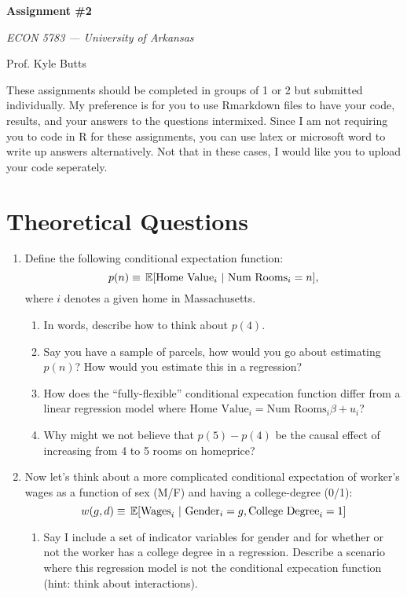 \documentclass[12pt]{article}
\begin{document}
\begin{center}
  {\Huge\bf Assignment \#2}
  
  \smallskip
  {\large\it  ECON 5783 — University of Arkansas}

  \medskip
  {\large Prof. Kyle Butts}
\end{center}

These assignments should be completed in groups of 1 or 2 but submitted individually. My preference is for you to use Rmarkdown files to have your code, results, and your answers to the questions intermixed. Since I am not requiring you to code in R for these assignments, you can use latex or microsoft word to write up answers alternatively. Not that in these cases, I would like you to upload your code seperately. 

\section*{Theoretical Questions}

\begin{enumerate}
  \item Define the following conditional expectation function: $$
    p(n) \equiv \expec{\text{Home Value}_i}{\text{Num Rooms}_i = n},
  $$
  where $i$ denotes a given home in Massachusetts. 
  \begin{enumerate}
    \item In words, describe how to think about $p(4)$.
    
    \item Say you have a sample of parcels, how would you go about estimating $p(n)$? How would you estimate this in a regression?
    
    \item How does the ``fully-flexible'' conditional expecation function differ from a linear regression model where $\text{Home Value}_i = \text{Num Rooms}_i \beta + u_i$?
    
    \item Why might we not believe that $p(5) - p(4)$ be the causal effect of increasing from 4 to 5 rooms on homeprice?
  \end{enumerate}

  \item Now let's think about a more complicated conditional expectation of worker's wages as a function of sex (M/F) and having a college-degree (0/1):
  $$
    w(g, d) \equiv \expec{\text{Wages}_i}{\text{Gender}_i = g, \text{College Degree}_i = 1}
  $$
  \begin{enumerate}
    \item Say I include a set of indicator variables for gender and for whether or not the worker has a college degree in a regression. Describe a scenario where this regression model is not the conditional expecation function (hint: think about interactions).
  \end{enumerate}
\end{enumerate}
\end{document}
